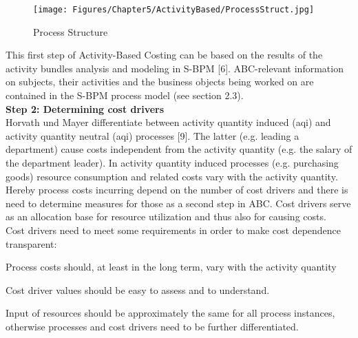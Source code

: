 \begin{figure}[htbp]
	\centering
	\texttt{[image: Figures/Chapter5/ActivityBased/ProcessStruct.jpg]}
	\caption[Process Structure]{Process Structure}
	\label{fig:ProcessStruct}
\end{figure}


This first step of Activity-Based Costing can be based on the results of the activity bundles analysis and modeling in S-BPM [6]. ABC-relevant information on subjects, their activities and the business objects being worked on are contained in the S-BPM process model (see section 2.3).
\\
\newline
\textbf{Step 2: Determining cost drivers}
\\
Horvath und Mayer differentiate between activity quantity induced (aqi) and activity quantity neutral (aqi) processes [9]. The latter (e.g. leading a department) cause costs independent from the activity quantity (e.g. the salary of the department leader). In activity quantity induced processes (e.g. purchasing goods) resource consumption and related costs vary with the activity quantity. Hereby process costs incurring depend on the number of cost drivers and there is need to determine measures for those as a second step in ABC. Cost drivers serve as an allocation base for resource utilization and thus also for causing costs.
\\
Cost drivers need to meet some requirements in order to make cost dependence transparent:
\begin{list}{-}{spacing}
	\item Process costs should, at least in the long term, vary with the activity quantity
	\item Cost driver values should be easy to assess and to understand.
	\item Input of resources should be approximately the same for all process instances, otherwise processes and cost drivers need to be further differentiated.
\end{list}

